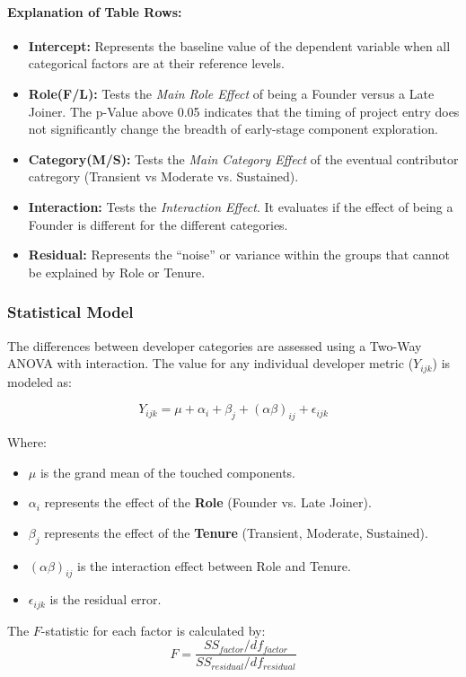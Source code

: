 \paragraph{Explanation of Table Rows:}
\begin{itemize}
    \item \textbf{Intercept:} Represents the baseline value of the dependent variable when all categorical factors are at their reference levels.
    \item \textbf{Role(F/L):} Tests the \textit{Main Role Effect} of being a Founder versus a Late Joiner. The p-Value above 0.05 indicates that the timing of project entry does not significantly change the breadth of early-stage component exploration.
    \item \textbf{Category(M/S):} Tests the \textit{Main Category Effect} of the eventual contributor catregory (Transient vs Moderate vs. Sustained). 
    \item \textbf{Interaction:} Tests the \textit{Interaction Effect}. It evaluates if the effect of being a Founder is different for the different categories. 
    \item \textbf{Residual:} Represents the ``noise'' or variance within the groups that cannot be explained by Role or Tenure. 
\end{itemize}


\subsubsection*{Statistical Model}
The differences between developer categories are assessed using a Two-Way ANOVA 
with interaction. The value for any individual developer metric ($Y_{ijk}$) 
is modeled as:

\begin{equation}
    Y_{ijk} = \mu + \alpha_i + \beta_j + (\alpha\beta)_{ij} + \epsilon_{ijk}
\end{equation}

Where:
\begin{itemize}
    \item $\mu$ is the grand mean of the touched components.
    \item $\alpha_i$ represents the effect of the \textbf{Role} (Founder vs. Late Joiner).
    \item $\beta_j$ represents the effect of the \textbf{Tenure} (Transient, Moderate, Sustained).
    \item $(\alpha\beta)_{ij}$ is the interaction effect between Role and Tenure.
    \item $\epsilon_{ijk}$ is the residual error.
\end{itemize}

The $F$-statistic for each factor is calculated by:
\begin{equation}
    F = \frac{SS_{factor} / df_{factor}}{SS_{residual} / df_{residual}}
\end{equation}

\newpage 
